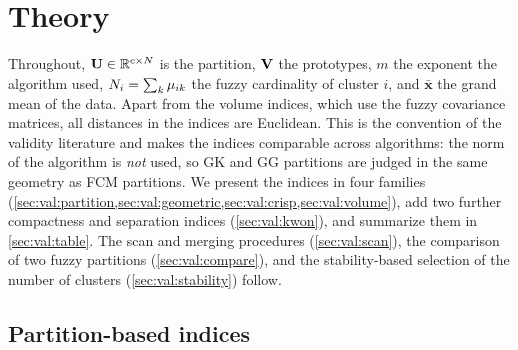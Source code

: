 \section{Theory}\label{sec:val:theory}

Throughout, $\mathbf{U}\in\mathbb{R}^{c\times N}$ is the partition, $\mathbf{V}$ the prototypes, $m$ the exponent the algorithm used, $N_i=\sum_k\mu_{ik}$ the fuzzy cardinality of cluster $i$, and $\bar{\mathbf{x}}$ the grand mean of the data. Apart from the volume indices, which use the fuzzy covariance matrices, all distances in the indices are Euclidean. This is the convention of the validity literature and makes the indices comparable across algorithms: the norm of the algorithm is \emph{not} used, so GK and GG partitions are judged in the same geometry as FCM partitions. We present the indices in four families (\cref{sec:val:partition,sec:val:geometric,sec:val:crisp,sec:val:volume}), add two further compactness and separation indices (\cref{sec:val:kwon}), and summarize them in \cref{sec:val:table}. The scan and merging procedures (\cref{sec:val:scan}), the comparison of two fuzzy partitions (\cref{sec:val:compare}), and the stability-based selection of the number of clusters (\cref{sec:val:stability}) follow.

\subsection{Partition-based indices}\label{sec:val:partition}

